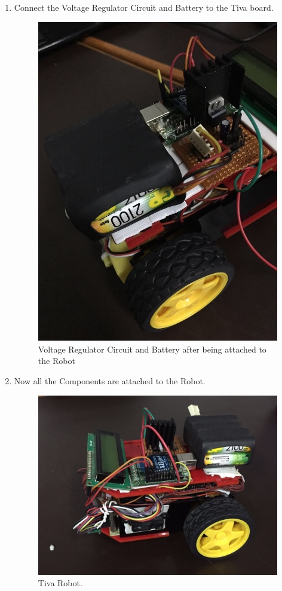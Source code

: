 \documentclass[a4paper,12pt,oneside]{book}
\begin{document}
\begin{enumerate}
\item Connect the Voltage Regulator Circuit and Battery to the Tiva board.
\begin{figure}[h]
        \centering
        \includegraphics[scale=0.16]{battery_a}
        \caption{ Voltage Regulator Circuit and Battery  after being attached to the Robot}
      \end{figure}

\item Now all the Components are attached to the Robot.
\begin{figure}[h]
        \centering
        \includegraphics[scale=0.16]{robot}
        \caption{Tiva Robot.}
      \end{figure}
    \newpage
\end{enumerate}
\end{document}
